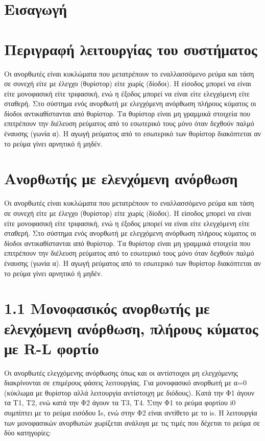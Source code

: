 \section*{Eισαγωγή}
\label{intro}

\section{Περιγραφή λειτουργίας του συστήματος}

Οι ανορθωτές είναι κυκλώματα που μετατρέπουν το εναλλασσόμενο ρεύμα και τάση σε συνεχή είτε με έλεγχο (θυρίστορ) είτε χωρίς (δίοδοι). Η είσοδος μπορεί να είναι είτε μονοφασική είτε τριφασική, ενώ η έξοδος μπορεί να είναι είτε ελεγχόμενη είτε σταθερή. Στο σύστημα ενός ανορθωτή με ελεγχόμενη ανόρθωση πλήρους κύματος οι δίοδοι αντικαθίστανται από θυρίστορ. Τα θυρίστορ είναι μη γραμμικά στοιχεία που επιτρέπουν την διέλευση ρεύματος από το εσωτερικό
τους μόνο όταν δεχθούν παλμό έναυσης (γωνία α). Η αγωγή ρεύματος από το εσωτερικό των θυρίστορ διακόπτεται αν το ρεύμα γίνει αρνητικό ή μηδέν.

\section*{Ανορθωτής με ελενχόμενη ανόρθωση}

Οι ανορθωτές είναι κυκλώματα που μετατρέπουν το εναλλασσόμενο ρεύμα και τάση σε συνεχή είτε με έλεγχο (θυρίστορ) είτε χωρίς (δίοδοι). Η είσοδος μπορεί να είναι είτε μονοφασική είτε τριφασική, ενώ η έξοδος μπορεί να είναι είτε ελεγχόμενη είτε σταθερή. Στο σύστημα ενός ανορθωτή με ελεγχόμενη ανόρθωση πλήρους κύματος οι δίοδοι αντικαθίστανται από θυρίστορ. Τα θυρίστορ είναι μη γραμμικά στοιχεία που επιτρέπουν την διέλευση ρεύματος από το εσωτερικό
τους μόνο όταν δεχθούν παλμό έναυσης (γωνία α). Η αγωγή ρεύματος από το εσωτερικό των θυρίστορ διακόπτεται αν το ρεύμα γίνει αρνητικό ή μηδέν.


\section*{1.1 Μονοφασικός ανορθωτής με ελενχόμενη ανόρθωση, πλήρους κύματος με R-L φορτίο}

Οι ανορθωτές ελεγχόμενης ανόρθωσης όπως και οι αντίστοιχοι μη ελεγχόμενης διακρίνονται σε επιμέρους φάσεις λειτουργίας. Για μονοφασικό ανορθωτή με α=0 (κύκλωμα με θυρίστορ αλλά λειτουργία αντίστοιχη με διόδους). Κατά την Φ1 άγουν τα T1, T2, ενώ κατά την Φ2 άγουν τα T3, T4. Στην Φ1 το ρεύμα φορτίου i0 συμπίπτει με το ρεύμα εισόδου Is, ενώ στην Φ2 είναι αντίθετο με το is.
Η λειτουργία των μονοφασικών ανορθωτών χωρίζεται ανάλογα με τις τιμές που δέχεται το ρεύμα σε δύο κατηγορίες:


